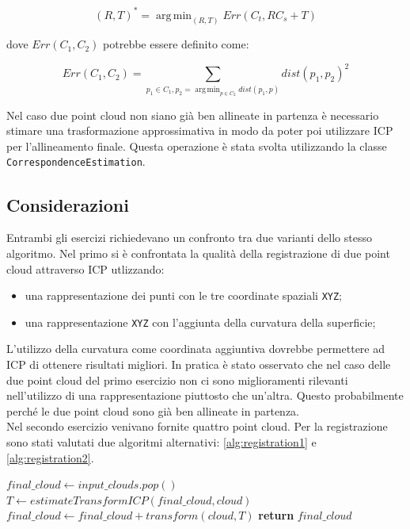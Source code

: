 \documentclass[a4paper]{article}
\DeclareMathOperator*{\argmin}{arg\,min}
\begin{document}
	\begin{equation}
	(R,T)^* = \argmin_{(R,T)}{Err(C_{t}, R C_{s} + T)}
	\end{equation}
	
	dove $Err(C_1, C_2)$ potrebbe essere definito come:
	
	\begin{equation}
	Err(C_1, C_2) = \sum_{p_1 \in C_1, p_2 = \argmin_{p \in C_2}{dist(p_1, p)}}{dist(p_1,p_2)^2}
	\end{equation}
	
	Nel caso due point cloud non siano già ben allineate in partenza è necessario stimare una trasformazione approssimativa in modo da poter poi utilizzare ICP per l'allineamento finale.
	Questa operazione è stata svolta utilizzando la classe \verb|CorrespondenceEstimation|.

	\subsection{Considerazioni} \label{sec:lab3_disc}
	Entrambi gli esercizi richiedevano un confronto tra due varianti dello stesso algoritmo. Nel primo si è confrontata la qualità della registrazione di due point cloud attraverso ICP utlizzando:
	\begin{itemize}
		\item una rappresentazione dei punti con le tre coordinate spaziali \verb|XYZ|;
		\item una rappresentazione \verb|XYZ| con l'aggiunta della curvatura della superficie;
	\end{itemize} 
	L'utilizzo della curvatura come coordinata aggiuntiva dovrebbe permettere ad ICP di ottenere risultati migliori. In pratica è stato osservato che nel caso delle due point cloud del primo esercizio non ci sono miglioramenti rilevanti nell'utilizzo di una rappresentazione piuttosto che un'altra. Questo probabilmente perché le due point cloud sono già ben allineate in partenza. \\
	Nel secondo esercizio venivano fornite quattro point cloud. Per la registrazione sono stati valutati due algoritmi alternativi: \ref{alg:registration1} e \ref{alg:registration2}.
	
	\begin{algorithm} 
		\caption{}
		\begin{algorithmic}
				\State $final\_cloud \gets input\_clouds.pop()$ 
					\State $T \gets estimateTransformICP(final\_cloud, cloud)$
					\State $final\_cloud \gets final\_cloud + transform(cloud,T)$
				\EndFor
				\State \textbf{return} $final\_cloud$
			\EndFunction
		\end{algorithmic}
	\label{alg:registration1}
	\end{algorithm}
\end{document}
